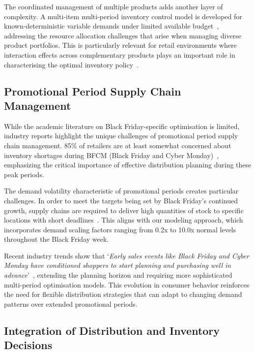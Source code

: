 \documentclass[a4paper,12pt]{article}
\begin{document}
The coordinated management of multiple products adds another layer of complexity.
A multi-item multi-period inventory control model is developed for known-deterministic variable demands under limited available budget~\cite{mahdavi2014multi}, addressing the resource allocation challenges that arise when managing diverse product portfolios.
This is particularly relevant for retail environments where interaction effects across complementary products plays an important role in characterising the optimal inventory policy~\cite{poormoaied2021inventory}.

\subsection{Promotional Period Supply Chain Management}\label{subsec:promotional-period-supply-chain-management}

While the academic literature on Black Friday-specific optimisation is limited, industry reports highlight the unique challenges of promotional period supply chain management.
85\% of retailers are at least somewhat concerned about inventory shortages during BFCM  (Black Friday and Cyber Monday)~\cite{anvyl2023black}, emphasizing the critical importance of effective distribution planning during these peak periods.

The demand volatility characteristic of promotional periods creates particular challenges.
In order to meet the targets being set by Black Friday's continued growth, supply chains are required to deliver high quantities of stock to specific locations with short deadlines~\cite{scmag2024black}.
This aligns with our modeling approach, which incorporates demand scaling factors ranging from 0.2x to 10.0x normal levels throughout the Black Friday week.

Recent industry trends show that `\textit{Early sales events like Black Friday and Cyber Monday have conditioned shoppers to start planning and purchasing well in advance}'~\cite{sc247consumer}, extending the planning horizon and requiring more sophisticated multi-period optimisation models.
This evolution in consumer behavior reinforces the need for flexible distribution strategies that can adapt to changing demand patterns over extended promotional periods.

\subsection{Integration of Distribution and Inventory Decisions}\label{subsec:integration-of-distribution-and-inventory-decisions}
\end{document}
